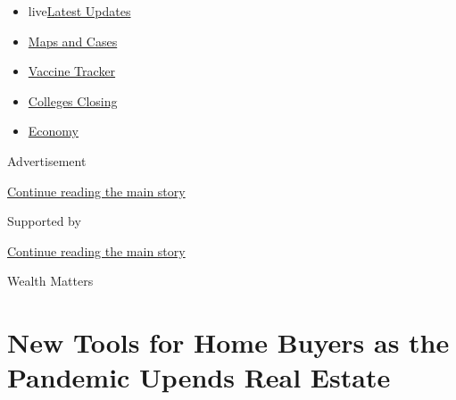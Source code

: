 \begin{itemize}
\tightlist
\item
  live\href{https://www.nytimes3xbfgragh.onion/2020/08/20/world/coronavirus-covid.html?name=styln-coronavirus-national\&region=TOP_BANNER\&variant=undefined\&block=storyline_menu_recirc\&action=click\&pgtype=Article\&impression_id=d788e550-e385-11ea-9f3a-f5bd08dc668f}{Latest
  Updates}
\item
  \href{https://www.nytimes3xbfgragh.onion/interactive/2020/us/coronavirus-us-cases.html?name=styln-coronavirus-national\&region=TOP_BANNER\&variant=undefined\&block=storyline_menu_recirc\&action=click\&pgtype=Article\&impression_id=d788e551-e385-11ea-9f3a-f5bd08dc668f}{Maps
  and Cases}
\item
  \href{https://www.nytimes3xbfgragh.onion/interactive/2020/science/coronavirus-vaccine-tracker.html?name=styln-coronavirus-national\&region=TOP_BANNER\&variant=undefined\&block=storyline_menu_recirc\&action=click\&pgtype=Article\&impression_id=d788e552-e385-11ea-9f3a-f5bd08dc668f}{Vaccine
  Tracker}
\item
  \href{https://www.nytimes3xbfgragh.onion/2020/08/19/us/colleges-closing-covid.html?name=styln-coronavirus-national\&region=TOP_BANNER\&variant=undefined\&block=storyline_menu_recirc\&action=click\&pgtype=Article\&impression_id=d788e553-e385-11ea-9f3a-f5bd08dc668f}{Colleges
  Closing}
\item
  \href{https://www.nytimes3xbfgragh.onion/live/2020/08/20/business/stock-market-today-coronavirus?name=styln-coronavirus-national\&region=TOP_BANNER\&variant=undefined\&block=storyline_menu_recirc\&action=click\&pgtype=Article\&impression_id=d788e554-e385-11ea-9f3a-f5bd08dc668f}{Economy}
\end{itemize}

Advertisement

\protect\hyperlink{after-top}{Continue reading the main story}

Supported by

\protect\hyperlink{after-sponsor}{Continue reading the main story}

Wealth Matters

\hypertarget{new-tools-for-home-buyers-as-the-pandemic-upends-real-estate}{%
\section{New Tools for Home Buyers as the Pandemic Upends Real
Estate}\label{new-tools-for-home-buyers-as-the-pandemic-upends-real-estate}}

